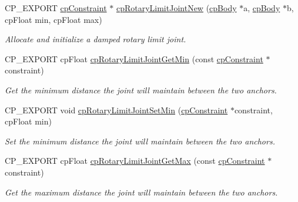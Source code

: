 \begin{DoxyCompactItemize}
\mbox{\label{group__cpRotaryLimitJoint_ga8aeab5b866e4bbde3ff8085de6b77db3}} 
C\+P\+\_\+\+E\+X\+P\+O\+RT \hyperlink{structcpConstraint}{cp\+Constraint} $\ast$ \hyperlink{group__cpRotaryLimitJoint_ga8aeab5b866e4bbde3ff8085de6b77db3}{cp\+Rotary\+Limit\+Joint\+New} (\hyperlink{structcpBody}{cp\+Body} $\ast$a, \hyperlink{structcpBody}{cp\+Body} $\ast$b, cp\+Float min, cp\+Float max)
\begin{DoxyCompactList}\small\item\em Allocate and initialize a damped rotary limit joint. \end{DoxyCompactList}\item 
\mbox{\label{group__cpRotaryLimitJoint_gaf46e42a44cfd7a7c6cfba362bf805d16}} 
C\+P\+\_\+\+E\+X\+P\+O\+RT cp\+Float \hyperlink{group__cpRotaryLimitJoint_gaf46e42a44cfd7a7c6cfba362bf805d16}{cp\+Rotary\+Limit\+Joint\+Get\+Min} (const \hyperlink{structcpConstraint}{cp\+Constraint} $\ast$constraint)
\begin{DoxyCompactList}\small\item\em Get the minimum distance the joint will maintain between the two anchors. \end{DoxyCompactList}\item 
\mbox{\label{group__cpRotaryLimitJoint_ga922e77b62755609ab1be093349a3acd0}} 
C\+P\+\_\+\+E\+X\+P\+O\+RT void \hyperlink{group__cpRotaryLimitJoint_ga922e77b62755609ab1be093349a3acd0}{cp\+Rotary\+Limit\+Joint\+Set\+Min} (\hyperlink{structcpConstraint}{cp\+Constraint} $\ast$constraint, cp\+Float min)
\begin{DoxyCompactList}\small\item\em Set the minimum distance the joint will maintain between the two anchors. \end{DoxyCompactList}\item 
\mbox{\label{group__cpRotaryLimitJoint_ga074951df3b5fd56e77b7a657c38b6ce9}} 
C\+P\+\_\+\+E\+X\+P\+O\+RT cp\+Float \hyperlink{group__cpRotaryLimitJoint_ga074951df3b5fd56e77b7a657c38b6ce9}{cp\+Rotary\+Limit\+Joint\+Get\+Max} (const \hyperlink{structcpConstraint}{cp\+Constraint} $\ast$constraint)
\begin{DoxyCompactList}\small\item\em Get the maximum distance the joint will maintain between the two anchors. \end{DoxyCompactList}\item 

\end{DoxyCompactItemize}
